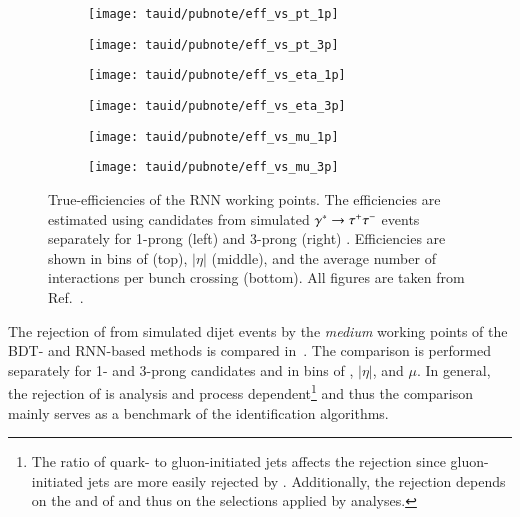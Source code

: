 \begin{figure}[htbp]

  \begin{subfigure}{0.498\textwidth}
    \texttt{[image: tauid/pubnote/eff\_vs\_pt\_1p]}
    \subcaption{}%
    \label{fig:tauid_truetau_eff_a}
  \end{subfigure}\hfill%
  \begin{subfigure}{0.498\textwidth}
    \texttt{[image: tauid/pubnote/eff\_vs\_pt\_3p]}
    \subcaption{}%
    \label{fig:tauid_truetau_eff_b}
  \end{subfigure}

  \begin{subfigure}{0.498\textwidth}
    \texttt{[image: tauid/pubnote/eff\_vs\_eta\_1p]}
    \subcaption{}
  \end{subfigure}\hfill%
  \begin{subfigure}{0.498\textwidth}
    \texttt{[image: tauid/pubnote/eff\_vs\_eta\_3p]}
    \subcaption{}
  \end{subfigure}

  \begin{subfigure}{0.498\textwidth}
    \texttt{[image: tauid/pubnote/eff\_vs\_mu\_1p]}
    \subcaption{}
  \end{subfigure}\hfill%
  \begin{subfigure}{0.498\textwidth}
    \texttt{[image: tauid/pubnote/eff\_vs\_mu\_3p]}
    \subcaption{}
  \end{subfigure}

  \caption[True-\tauhadvis efficiencies of the RNN \tauid working
  points.]{True-\tauhadvis efficiencies of the RNN \tauid working points. The
    efficiencies are estimated using \tauhadvis candidates from simulated
    $\gamma^{*} \to \tau^{+} \tau^{-}$ events separately for 1-prong (left) and 3-prong
    (right) \tauhadvis. Efficiencies are shown in bins of \tauhadvis \pT (top),
    \tauhadvis $|\eta|$ (middle), and the average number of interactions per
    bunch crossing (bottom). All figures are taken from
    Ref.~\cite{ATL-PHYS-PUB-2019-033}.}%
  \label{fig:tauid_truetau_eff}
\end{figure}

The rejection of \faketauhadvis from simulated dijet events by the \emph{medium}
\tauid working points of the BDT- and RNN-based methods is compared
in~. The comparison is performed separately for 1-
and 3-prong \tauhadvis candidates and in bins of \tauhadvis \pT, \tauhadvis
$|\eta|$, and $\mu$. In general, the \faketauhadvisC rejection of \tauid is
analysis and process dependent\footnote{The ratio of quark- to gluon-initiated
  jets affects the \faketauhadvisC rejection since gluon-initiated jets are more
  easily rejected by \tauid. Additionally, the rejection depends on the \pT and
  \Ntracks of \faketauhadvis and thus on the selections applied by analyses.}
and thus the comparison mainly serves as a benchmark of the identification
algorithms.

